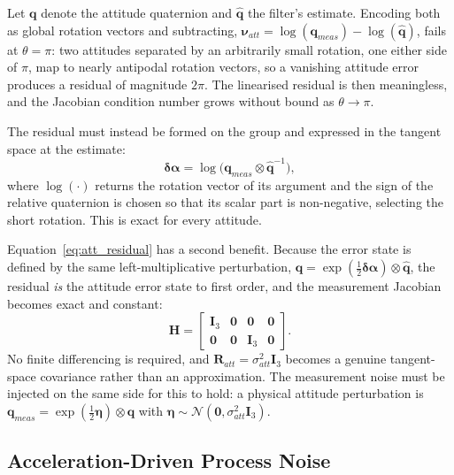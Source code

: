 Let $\mathbf{q}$ denote the attitude quaternion and $\hat{\mathbf{q}}$ the
filter's estimate. Encoding both as global rotation vectors and subtracting,
$\boldsymbol{\nu}_{att} = \log(\mathbf{q}_{meas}) - \log(\hat{\mathbf{q}})$,
fails at $\theta = \pi$: two attitudes separated by an arbitrarily small
rotation, one either side of $\pi$, map to nearly antipodal rotation vectors,
so a vanishing attitude error produces a residual of magnitude $2\pi$. The
linearised residual is then meaningless, and the Jacobian condition number
grows without bound as $\theta \to \pi$.

The residual must instead be formed on the group and expressed in the tangent
space at the estimate:
\begin{equation}
\boldsymbol{\delta\alpha}
  = \log\!\bigl( \mathbf{q}_{meas} \otimes \hat{\mathbf{q}}^{-1} \bigr) ,
\label{eq:att_residual}
\end{equation}
where $\log(\cdot)$ returns the rotation vector of its argument and the sign of
the relative quaternion is chosen so that its scalar part is non-negative,
selecting the short rotation. This is exact for every attitude.

Equation~\eqref{eq:att_residual} has a second benefit. Because the error state
is defined by the same left-multiplicative perturbation,
$\mathbf{q} = \exp(\tfrac{1}{2}\boldsymbol{\delta\alpha}) \otimes
\hat{\mathbf{q}}$, the residual \emph{is} the attitude error state to first
order, and the measurement Jacobian becomes exact and constant:
\begin{equation}
\mathbf{H} =
\begin{bmatrix}
\mathbf{I}_3 & \mathbf{0} & \mathbf{0} & \mathbf{0} \\
\mathbf{0} & \mathbf{0} & \mathbf{I}_3 & \mathbf{0}
\end{bmatrix} .
\label{eq:H_exact}
\end{equation}
No finite differencing is required, and $\mathbf{R}_{att} = \sigma_{att}^2
\mathbf{I}_3$ becomes a genuine tangent-space covariance rather than an
approximation. The measurement noise must be injected on the same side for
this to hold: a physical attitude perturbation is
$\mathbf{q}_{meas} = \exp(\tfrac{1}{2}\boldsymbol{\eta}) \otimes \mathbf{q}$
with $\boldsymbol{\eta} \sim \mathcal{N}(\mathbf{0},
\sigma_{att}^2\mathbf{I}_3)$.

\subsection{Acceleration-Driven Process Noise}
\label{sec:process_noise}


